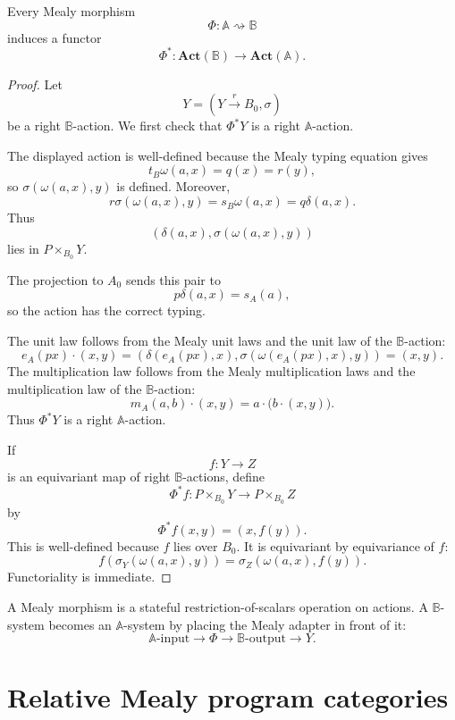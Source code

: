 \begin{theorem}
\label{thm:mealy-restriction-functor}
Every Mealy morphism
\[
\Phi:\mathbb A\rightsquigarrow\mathbb B
\]
induces a functor
\[
\Phi^\ast:\mathbf{Act}(\mathbb B)\to\mathbf{Act}(\mathbb A).
\]
\end{theorem}

\begin{proof}
Let
\[
Y=(Y\xrightarrow{r}B_0,\sigma)
\]
be a right \(\mathbb B\)-action. We first check that
\(\Phi^\ast Y\) is a right \(\mathbb A\)-action.

The displayed action is well-defined because the Mealy typing equation gives
\[
t_B\omega(a,x)=q(x)=r(y),
\]
so \(\sigma(\omega(a,x),y)\) is defined. Moreover,
\[
r\sigma(\omega(a,x),y)
=
s_B\omega(a,x)
=
q\delta(a,x).
\]
Thus
\[
\left(
\delta(a,x),
\sigma(\omega(a,x),y)
\right)
\]
lies in \(P\times_{B_0}Y\).

The projection to \(A_0\) sends this pair to
\[
p\delta(a,x)=s_A(a),
\]
so the action has the correct typing.

The unit law follows from the Mealy unit laws and the unit law of the
\(\mathbb B\)-action:
\[
e_A(px)\cdot(x,y)
=
\left(
\delta(e_A(px),x),
\sigma(\omega(e_A(px),x),y)
\right)
=
(x,y).
\]
The multiplication law follows from the Mealy multiplication laws and the
multiplication law of the \(\mathbb B\)-action:
\[
m_A(a,b)\cdot(x,y)
=
a\cdot\bigl(b\cdot(x,y)\bigr).
\]
Thus \(\Phi^\ast Y\) is a right \(\mathbb A\)-action.

If
\[
f:Y\to Z
\]
is an equivariant map of right \(\mathbb B\)-actions, define
\[
\Phi^\ast f:P\times_{B_0}Y\to P\times_{B_0}Z
\]
by
\[
\Phi^\ast f(x,y)=(x,f(y)).
\]
This is well-defined because \(f\) lies over \(B_0\). It is equivariant by
equivariance of \(f\):
\[
f(\sigma_Y(\omega(a,x),y))
=
\sigma_Z(\omega(a,x),f(y)).
\]
Functoriality is immediate.
\end{proof}

\begin{remark}
\label{rem:mealy-restriction-slogan}
A Mealy morphism is a stateful restriction-of-scalars operation on actions. A
\(\mathbb B\)-system becomes an \(\mathbb A\)-system by placing the Mealy
adapter in front of it:
\[
\mathbb A\text{-input}
\longrightarrow
\Phi
\longrightarrow
\mathbb B\text{-output}
\longrightarrow
Y.
\]
\end{remark}

\section{Relative Mealy program categories}
\label{sec:relative-mealy-program-categories}

